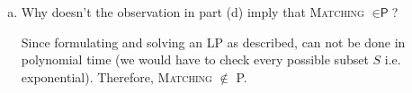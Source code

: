 \documentclass[11pt]{article}
\begin{document}
\begin{enumerate}[(a)]
\begin{solution}
    \end{solution}
    \item Why doesn't the observation in part (d) imply that \textsc{Matching} $\in \textsf{P}$?\\
    \begin{solution}
        Since formulating and solving an LP as described, can not be done in polynomial time (we would have to check every possible subset $S$ i.e. exponential). Therefore, \textsc{Matching} $\not \in$ P.
    \end{solution}
\end{enumerate}
\end{document}

